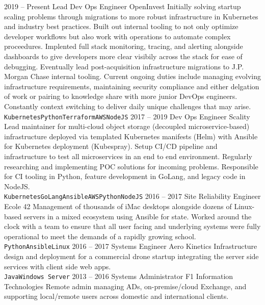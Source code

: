 \documentclass[10pt]{developercv} %
\begin{document}
\begin{entrylist}
	\entry
		{2019 -- Present}
		{\Large Lead Dev Ops Engineer}
		{\large OpenInvest}
		{\small Initially solving startup scaling problems through migrations to more robust infrastructure in \mbox{Kubernetes} and industry best practices. Built out
		internal tooling to not only optimize developer workflows but also work with operations to automate complex proceedures. Implented full stack monitoring, 
		tracing, and alerting alongside dashboards to give developers more clear visibily across the stack for ease of debugging. Eventually lead post-acquisition
		infrastructure migrations to J.P. Morgan Chase internal tooling. Current ongoing duties include managing evolving infrastructure requirements, maintaining
		security compliance and either delgation of work or pairing to knowledge share with more junior DevOps engineers. Constantly context switching to deliver
		daily unique challenges that may arise. \\
		\texttt{Kubernetes}\slashsep\texttt{Python}\slashsep\texttt{Terraform}\slashsep\texttt{AWS}\slashsep\texttt{NodeJS}}
	\entry
		{2017 -- 2019}
		{\Large Dev Ops Engineer}
		{\large Scality}
		{\small Lead maintainer for multi-cloud object storage (decoupled microservice-based) infrastructure
		deployed via templated Kubernetes manifests (Helm) with Ansible for Kubernetes deployment (Kubespray).
		Setup CI/CD pipeline and infrastructure to test all microservices in an end to end environment. Regularly
		researching and implementing POC solutions for incoming problems. Responsible for CI tooling in Python,
		feature development in GoLang, and legacy code in NodeJS.\\
		\texttt{Kubernetes}\slashsep\texttt{GoLang}\slashsep\texttt{Ansible}\slashsep\texttt{AWS}\slashsep\texttt{Python}\slashsep\texttt{NodeJS}}
	\entry
		{2016 -- 2017}
		{\Large Site Reliability Engineer}
		{\large Ecole 42}
		{\small Management of thousands of iMac desktops alongside dozens of Linux-based servers in a mixed ecosystem using Ansible for state. Worked around
		the clock with a team to ensure that all user facing and underlying systems were fully operational to meet the demands of a rapidly growing school. \\
		\texttt{Python}\slashsep\texttt{Ansible}\slashsep\texttt{Linux}}
	\entry
		{2016 -- 2017}
		{\Large Systems Engineer}
		{\large Aero Kinetics}
		{\small Infrastructure design and deployment for a commercial drone startup integrating the server side services with client side web apps.\\\texttt{Java}\slashsep\texttt{Windows Server}}
	\entry
		{2013 -- 2016}
		{\Large Systems Administrator}
		{\large F1 Information Technologies}
		{\small Remote admin managing ADs, on-premise/cloud Exchange, and supporting local/remote users across domestic and international clients.}


\end{entrylist}
\end{document}
